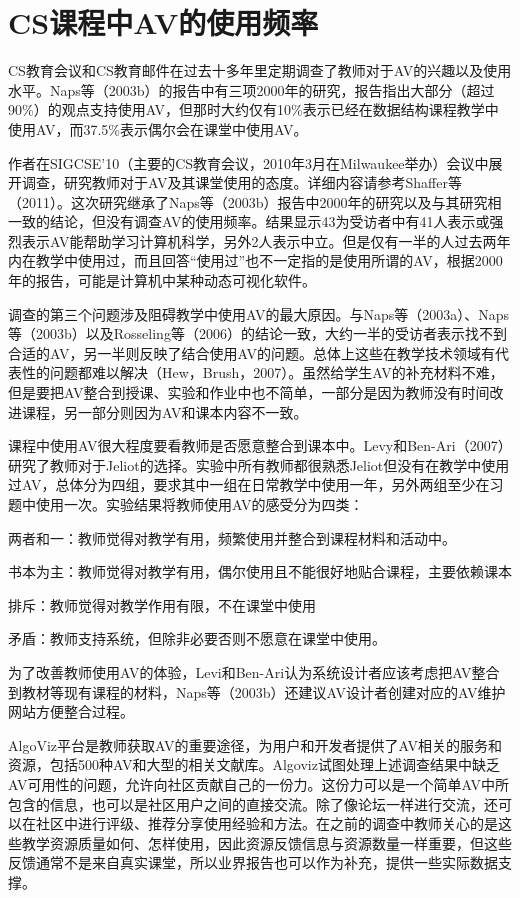 \chapter{CS课程中AV的使用频率}
\begin{sectext}
CS教育会议和CS教育邮件在过去十多年里定期调查了教师对于AV的兴趣以及使用水平。Naps等（2003b）的报告中有三项2000年的研究，报告指出大部分（超过90\%）的观点支持使用AV，但那时大约仅有10\%表示已经在数据结构课程教学中使用AV，而37.5\%表示偶尔会在课堂中使用AV。

作者在SIGCSE'10（主要的CS教育会议，2010年3月在Milwaukee举办）会议中展开调查，研究教师对于AV及其课堂使用的态度。详细内容请参考Shaffer等（2011）。这次研究继承了Naps等（2003b）报告中2000年的研究以及与其研究相一致的结论，但没有调查AV的使用频率。结果显示43为受访者中有41人表示或强烈表示AV能帮助学习计算机科学，另外2人表示中立。但是仅有一半的人过去两年内在教学中使用过，而且回答``使用过''也不一定指的是使用所谓的AV，根据2000年的报告，可能是计算机中某种动态可视化软件。

调查的第三个问题涉及阻碍教学中使用AV的最大原因。与Naps等（2003a）、Naps等（2003b）以及Rosseling等（2006）的结论一致，大约一半的受访者表示找不到合适的AV，另一半则反映了结合使用AV的问题。总体上这些在教学技术领域有代表性的问题都难以解决（Hew，Brush，2007）。虽然给学生AV的补充材料不难，但是要把AV整合到授课、实验和作业中也不简单，一部分是因为教师没有时间改进课程，另一部分则因为AV和课本内容不一致。

课程中使用AV很大程度要看教师是否愿意整合到课本中。Levy和Ben-Ari（2007）研究了教师对于Jeliot的选择。实验中所有教师都很熟悉Jeliot但没有在教学中使用过AV，总体分为四组，要求其中一组在日常教学中使用一年，另外两组至少在习题中使用一次。实验结果将教师使用AV的感受分为四类：

两者和一：教师觉得对教学有用，频繁使用并整合到课程材料和活动中。

书本为主：教师觉得对教学有用，偶尔使用且不能很好地贴合课程，主要依赖课本

排斥：教师觉得对教学作用有限，不在课堂中使用

矛盾：教师支持系统，但除非必要否则不愿意在课堂中使用。

为了改善教师使用AV的体验，Levi和Ben-Ari认为系统设计者应该考虑把AV整合到教材等现有课程的材料，Naps等（2003b）还建议AV设计者创建对应的AV维护网站方便整合过程。

AlgoViz平台是教师获取AV的重要途径，为用户和开发者提供了AV相关的服务和资源，包括500种AV和大型的相关文献库。Algoviz试图处理上述调查结果中缺乏AV可用性的问题，允许向社区贡献自己的一份力。这份力可以是一个简单AV中所包含的信息，也可以是社区用户之间的直接交流。除了像论坛一样进行交流，还可以在社区中进行评级、推荐分享使用经验和方法。在之前的调查中教师关心的是这些教学资源质量如何、怎样使用，因此资源反馈信息与资源数量一样重要，但这些反馈通常不是来自真实课堂，所以业界报告也可以作为补充，提供一些实际数据支撑。


\end{sectext}
